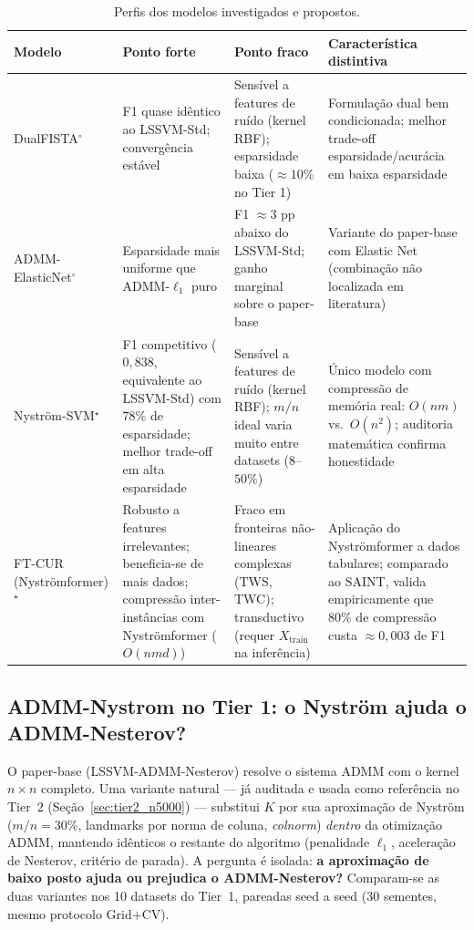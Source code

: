 \documentclass[12pt,a4paper]{article}
\begin{document}
\begin{table}[H]
\centering
\caption{Perfis dos modelos investigados e propostos.}
\label{tab:profiles}
\begin{tabular}{lp{3.0cm}p{3.0cm}p{3.5cm}}
\toprule
\textbf{Modelo} & \textbf{Ponto forte} & \textbf{Ponto fraco} & \textbf{Característica distintiva} \\
\midrule
DualFISTA$^\circ$
  & F1 quase idêntico ao LSSVM-Std; convergência estável
  & Sensível a features de ruído (kernel RBF); esparsidade baixa ($\approx 10\%$ no Tier 1)
  & Formulação dual bem condicionada; melhor trade-off esparsidade/acurácia em baixa esparsidade \\
\addlinespace
ADMM-ElasticNet$^\circ$
  & Esparsidade mais uniforme que ADMM-$\ell_1$ puro
  & F1 $\approx 3$ pp abaixo do LSSVM-Std; ganho marginal sobre o paper-base
  & Variante do paper-base com Elastic Net (combinação não localizada em literatura) \\
\addlinespace
Nyström-SVM$^\star$
  & F1 competitivo ($0{,}838$, equivalente ao LSSVM-Std) com $78\%$ de esparsidade;
    melhor trade-off em alta esparsidade
  & Sensível a features de ruído (kernel RBF); $m/n$ ideal varia muito entre datasets ($8$--$50\%$)
  & Único modelo com compressão de memória real: $O(nm)$ vs.\ $O(n^2)$; auditoria matemática confirma honestidade \\
\addlinespace
FT-CUR (Nyströmformer)$^\star$
  & Robusto a features irrelevantes; beneficia-se de mais dados; compressão
    inter-instâncias com Nyströmformer ($O(nmd)$)
  & Fraco em fronteiras não-lineares complexas (TWS, TWC); transductivo
    (requer $X_\text{train}$ na inferência)
  & Aplicação do Nyströmformer a dados tabulares; comparado ao SAINT, valida
    empiricamente que $80\%$ de compressão custa $\approx 0{,}003$ de F1 \\
\bottomrule
\end{tabular}
\end{table}

\subsection{ADMM-Nystrom no Tier 1: o Nyström ajuda o ADMM-Nesterov?}
\label{sec:admm_nystrom_tier1}

O paper-base (LSSVM-ADMM-Nesterov) resolve o sistema ADMM com o kernel
$n \times n$ completo. Uma variante natural --- já auditada e usada como
referência no Tier~2 (Seção~\ref{sec:tier2_n5000}) --- substitui
$K$ por sua aproximação de Nyström ($m/n = 30\%$, landmarks por norma de
coluna, \emph{colnorm}) \emph{dentro} da otimização ADMM, mantendo idênticos
o restante do algoritmo (penalidade $\ell_1$, aceleração de Nesterov,
critério de parada). A pergunta é isolada: \textbf{a aproximação de baixo
posto ajuda ou prejudica o ADMM-Nesterov?} Comparam-se as duas variantes nos
10 datasets do Tier~1, pareadas seed a seed (30 sementes, mesmo protocolo
Grid+CV).
\end{document}
